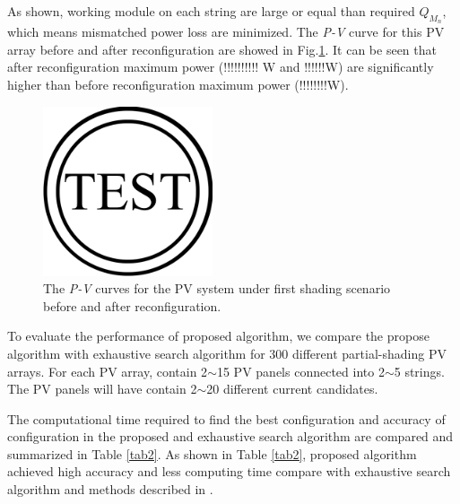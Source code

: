 \documentclass[conference]{IEEEtran}
\begin{document}
As shown, working module on each string are large or equal than required \textit{$Q_{M_n}$}, which means mismatched power loss are minimized. The \textit{P-V} curve for this PV array before and after reconfiguration are showed in Fig.\ref{fig6}. It can be seen that after reconfiguration maximum power (!!!!!!!!!! W and !!!!!!W) are significantly higher than before reconfiguration maximum power (!!!!!!!!W).

\begin{figure}[htbp]
\centerline{\includegraphics[width=5cm]{fig2.png}}
\caption{The \textit{P-V} curves for the PV system under first shading scenario before and after reconfiguration.}
\label{fig6}
\end{figure}

To evaluate the performance of proposed algorithm, we compare the propose algorithm with exhaustive search algorithm for 300 different partial-shading PV arrays. For each PV array, contain 2$\sim$15 PV panels connected into 2$\sim$5 strings. The PV panels will have contain 2$\sim$20 different current candidates. 



The computational time required to find the best configuration and accuracy of configuration in the proposed and exhaustive search algorithm are compared and summarized in Table \ref{tab2}. As shown in Table \ref{tab2}, proposed algorithm achieved high accuracy and less computing time compare with exhaustive search algorithm and methods described in \cite{b10}. %
\end{document}

